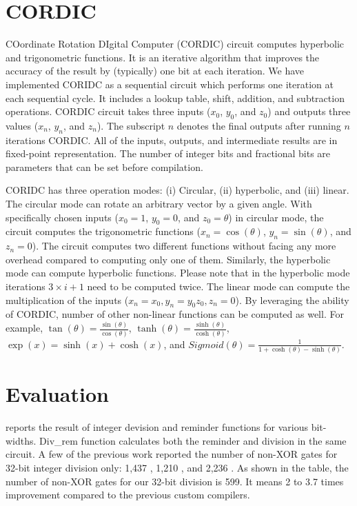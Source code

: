 \section{CORDIC}
COordinate Rotation DIgital Computer (CORDIC) circuit computes hyperbolic and trigonometric functions.
It is an iterative algorithm that improves the accuracy of the result by (typically) one bit at each iteration.
We have implemented CORIDC as a sequential circuit which performs one iteration at each sequential cycle.
It includes a lookup table, shift, addition, and subtraction operations.
CORDIC circuit takes three inputs ($x_0$, $y_0$, and $z_0$) and outputs three values ($x_n$, $y_n$, and $z_n$).
The subscript $n$ denotes the final outputs after running $n$ iterations CORDIC.
All of the inputs, outputs, and intermediate results are in fixed-point representation.
The number of integer bits and fractional bits are parameters that can be set before compilation.

CORIDC has three operation modes:
(i) Circular, (ii) hyperbolic, and (iii) linear.
The circular mode can rotate an arbitrary vector by a given angle.
With specifically chosen inputs ($x_0=1$, $y_0=0$, and $z_0=\theta$) in circular mode, the circuit computes the trigonometric functions ($x_n=\cos(\theta)$, $y_n=\sin(\theta)$, and $z_n=0$).
The circuit computes two different functions without facing any more overhead compared to computing only one of them.
Similarly, the hyperbolic mode can compute hyperbolic functions.
Please note that in the hyperbolic mode iterations $3\times i+1$ need to be computed twice.
The linear mode can compute the multiplication of the inputs ($x_n=x_0, y_n=y_0z_0, z_n=0$).
By leveraging the ability of CORDIC, number of other non-linear functions can be computed as well.
For example,
$\tan(\theta)=\frac{\sin(\theta)}{\cos(\theta)}$,
$\tanh(\theta)=\frac{\sinh(\theta)}{\cosh(\theta)}$,
$\exp(x)=\sinh (x) + \cosh (x)$, and
$Sigmoid(\theta)=\frac{1}{1+\cosh(\theta)-\sinh(\theta)}$.

\section{Evaluation}
 reports the result of integer devision and reminder functions for various bit-widths.
Div\_rem function calculates both the reminder and division in the same circuit.
A few of the previous work reported the number of non-XOR gates for 32-bit integer division only: 1,437 \cite{mood2016frigate}, 1,210 \cite{zahur2015obliv}, and 2,236 \cite{liu2015oblivm}.
As shown in the table, the number of non-XOR gates for our 32-bit division is 599.
It means 2 to 3.7 times improvement compared to the previous custom compilers.

